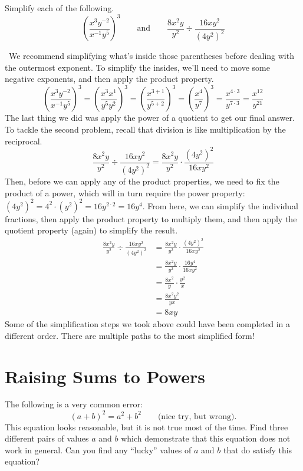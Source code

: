 \begin{boxedex}
Simplify each of the following.
\[\left(\frac{x^3y^{-2}}{x^{-1}y^5}\right)^3 \qquad\text{and}\qquad \frac{8x^2y}{y^2}\div\frac{16xy^2}{(4y^2)^2}\]

\exsoln\ We recommend simplifying what's inside those parentheses before dealing with the outermost exponent. To simplify the insides, we'll need to move some negative exponents, and then apply the product property.
\[\left(\frac{x^3y^{-2}}{x^{-1}y^5}\right)^3
= \left(\frac{x^3x^{1}}{y^5y^2}\right)^3
= \left(\frac{x^{3+1}}{y^{5+2}}\right)^3
= \left(\frac{x^4}{y^7}\right)^3
= \frac{x^{4\cdot3}}{y^{7\cdot3}}
= \frac{x^{12}}{y^{21}}
\]
The last thing we did was apply the power of a quotient to get our final answer. To tackle the second problem, recall that division is like multiplication by the reciprocal. 
\[\frac{8x^2y}{y^2}\div\frac{16xy^2}{(4y^2)^2} = \frac{8x^2y}{y^2}\cdot\frac{(4y^2)^2}{16xy^2}\]
Then, before we can apply any of the product properties, we need to fix the product of a power, which will in turn require the power property: $(4y^2)^2 = 4^2 \cdot (y^2)^2 = 16 y^{2\cdot2} = 16y^4$. From here, we can simplify the individual fractions, then apply the product property to multiply them, and then apply the quotient property (again) to simplify the result.
\[\begin{aligned}
\frac{8x^2y}{y^2}\div\frac{16xy^2}{(4y^2)^2}
&= \frac{8x^2y}{y^2}\cdot\frac{(4y^2)^2}{16xy^2}
\\[1ex]&= \frac{8x^2y}{y^2}\cdot\frac{16y^4}{16xy^2}
\\[1ex]&= \frac{8x^2}{y}\cdot\frac{y^2}{x}
\\[1ex]&= \frac{8x^2y^2}{yx}
\\[1ex]&= 8xy
\end{aligned}\]
Some of the simplification steps we took above could have been completed in a different order. There are multiple paths to the most simplified form!
\end{boxedex}


\section{Raising Sums to Powers}
\label{sec:exposumstopowers}

\begin{boxedexplore}
The following is a very common error: \[(a+b)^2 = a^2 + b^2 \qquad\text{(nice try, but wrong)}.\] This equation looks reasonable, but it is not true most of the time. Find three different pairs of values $a$ and $b$ which demonstrate that this equation does not work in general. Can you find any ``lucky'' values of $a$ and $b$ that do satisfy this equation?
\end{boxedexplore}

